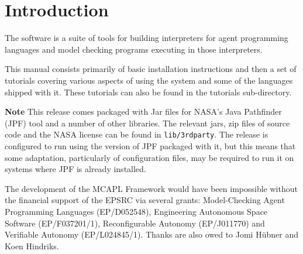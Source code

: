 \chapter{Introduction}

The \mcapl{} software is a suite of tools for building interpreters
for agent programming languages and  model checking programs
executing in those interpreters.  

This manual consists primarily of basic installation instructions and then a set of tutorials covering various aspects of using the system and some of the languages shipped with it.  These tutorials can also be found in the tutorials sub-directory.

{\bf Note} This release comes packaged with Jar files for NASA's Java Pathfinder (JPF) tool and a number of other libraries.  The relevant jars, zip files of source code and the NASA license can be found in \texttt{lib/3rdparty}.  The release is configured to run using the version of JPF packaged with it, but this means that some adaptation, particularly of configuration files, may be required to run it on systems where JPF is already installed.

The development of the MCAPL Framework would have been impossible without the financial support of the EPSRC via several grants: Model-Checking Agent Programming Languages (EP/D052548), Engineering Autonomous Space Software (EP/F037201/1), Reconfigurable Autonomy (EP/J011770) and Verifiable Autonomy (EP/L024845/1).  Thanks are also owed to Jomi H\"{u}bner and Koen Hindriks.
